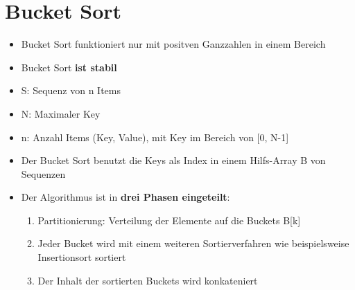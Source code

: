 \section{Bucket Sort}
\begin{itemize}
	\item Bucket Sort funktioniert nur mit positven Ganzzahlen in einem Bereich
	\item Bucket Sort \textbf{ist stabil}
	\item S: Sequenz von n Items
	\item N: Maximaler Key
	\item n: Anzahl Items (Key, Value), mit Key im Bereich von [0, N-1]
	\item Der Bucket Sort benutzt die Keys als Index in einem Hilfs-Array B von Sequenzen
	\item Der Algorithmus ist in \textbf{drei Phasen eingeteilt}:
	\begin{enumerate}
		\item Partitionierung: Verteilung der Elemente auf die Buckets B[k]
		\item Jeder Bucket wird mit einem weiteren Sortierverfahren wie beispielsweise Insertionsort sortiert
		\item Der Inhalt der sortierten Buckets wird konkateniert
	\end{enumerate}
\end{itemize}

